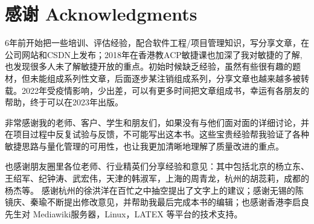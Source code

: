 \chapter*{感谢 Acknowledgments } %

6年前开始把一些培训、评估经验，配合软件工程/项目管理知识，写分享文章，在公司网站和CSDN上发布；2018年在香港教ACP敏捷课也加深了我对敏捷的了解,也发现很多人未了解敏捷开放的重点。初始时候缺乏经验，虽然有些很有趣的题材，但未能组成系列性文章，后面逐步某注销组成系列，分享文章也越来越多被转载。2022年受疫情影响，少出差，可以有更多时间把文章组成书，幸运有各朋友的帮助，终于可以在2023年出版。

非常感谢我的老师、客户、学生和朋友们，如果没有与他们面对面的详细讨论，并在项目过程中反复试验与反馈，不可能写出这本书。这些宝贵经验帮我验证了各种敏捷思路与量化管理的可用性，也让我更加清晰地理解了质量改进的重点。

也感谢朋友圈里各位老师、行业精英们分享经验和意见：其中包括北京的杨立东、王绍军、纪钟涛、武宏伟，天津的韩淑军，上海的周青龙，杭州的胡蕊莉，成都的杨杰等。
感谢杭州的徐洪洋在百忙之中抽空提出了文字上的建议；感谢无锡的陈镜庆、秦瑜不断提出修改意见，并帮助我最后完成本书的编辑；也感谢香港李启良先生对
Mediawiki服务器，Linux，LATEX 等平台的技术支持。
